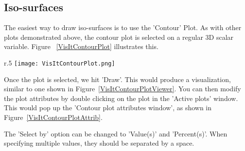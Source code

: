 \begin{figure}[h]
  \centering
 \vspace{-5pt}
  \hspace{50pt}
 \vspace{-10pt}
  \caption{}
 \vspace{-10pt}
  \label{}
\end{figure}

\subsection{Iso-surfaces}

The easiest way to draw iso-surfaces is to use the 'Contour' Plot. As
with other plots demonstrated above, the contour plot is selected on a
regular 3D scalar variable. Figure ~\ref{VisItContourPlot} illustrates
this.

\begin{wrapfigure}{r}{.5\textwidth}
  \center
  \vspace{-35pt}
  \texttt{[image: VisItContourPlot.png]}
  \caption{Selecting the 'Contour' plot on a regular 3D scalar variable}
  \label{VisItContourPlot}
\end{wrapfigure}

Once the plot is selected, we hit 'Draw'. This would produce a
visualization, similar to one shown in
Figure~\ref{VisItContourPlotViewer}. You can then modify the plot
attributes by double clicking on the plot in the 'Active plots'
window. This would pop up the 'Contour plot attributes window', as
shown in Figure~\ref{VisItContourPlotAttrib}.

The 'Select by' option can be changed to 'Value(s)' and
'Percent(s)'. When specifying multiple values, they should be
separated by a space.




